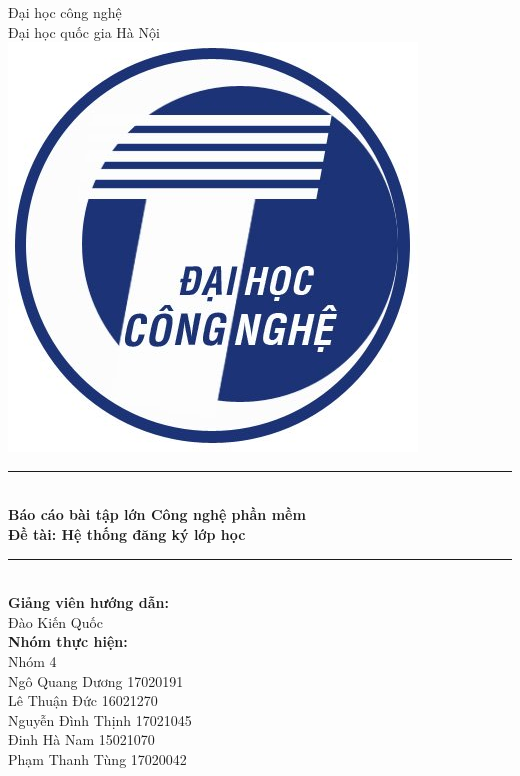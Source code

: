\documentclass[12pt]{book}
\title{}
\author{}
\date{}
\newcommand\HRule{\rule{\textwidth}{1pt}}
\begin{document}
\begin{titlepage}

  
  \begin{center}
  
  {\Large Đại học công nghệ\\
  Đại học quốc gia Hà Nội }\\[0.5cm]
  \includegraphics[scale=0.3]{../pictures/3-VNU-UET.jpg}
  
  \HRule \\[0.4cm]
  { \Large \bfseries Báo cáo bài tập lớn Công nghệ phần mềm \\
    Đề tài: Hệ thống đăng ký lớp học
  }\\[0.4cm]
  
  \HRule \\[4cm]
  
    \textbf{Giảng viên hướng dẫn:} \\
    Đào Kiến Quốc \\[0.3cm]
  
    \textbf{Nhóm thực hiện:}\\
    Nhóm 4 \\
    Ngô Quang Dương 17020191\\
    Lê Thuận Đức 16021270\\
    Nguyễn Đình Thịnh 17021045\\
    Đinh Hà Nam 15021070 \\
    Phạm Thanh Tùng 17020042
  
  \vfill
  
  \end{center}
  
  \end{titlepage}
\end{document}
